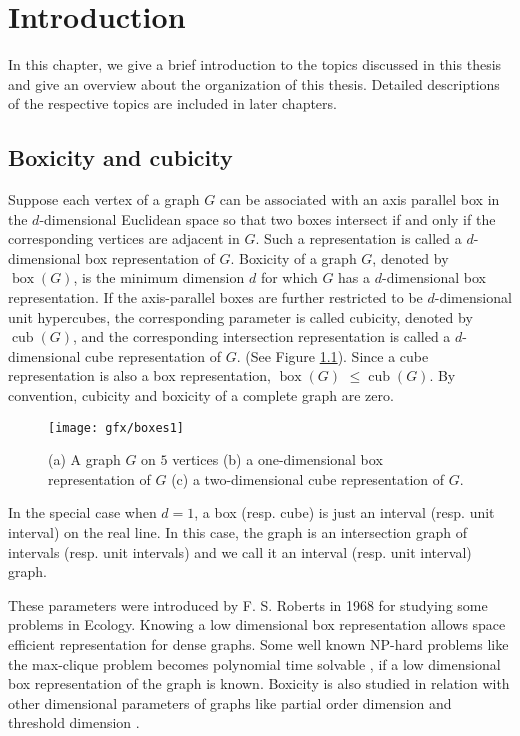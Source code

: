\chapter{Introduction}\label{ch:intro}
In this chapter, we give a brief introduction to the topics discussed in this thesis and give an overview about the organization of this thesis. 
Detailed descriptions of the respective topics are included in later chapters. 
\section{Boxicity and cubicity}\label{introboxicity}
Suppose each vertex of a graph $G$ can be associated with an axis parallel box in the $d$-dimensional Euclidean space so that 
two boxes intersect if and only if the corresponding vertices are adjacent in $G$. 
Such a representation is called  a $d$-dimensional box representation of $G$. 
Boxicity of a graph $G$, denoted by $\operatorname{box}(G)$, is the minimum dimension $d$ for which $G$ has 
a $d$-dimensional box representation.
If the axis-parallel boxes are further restricted to be $d$-dimensional unit hypercubes, the corresponding parameter is called cubicity, 
denoted by $\operatorname{cub}(G)$, and the 
corresponding intersection representation is called a $d$-dimensional cube representation of $G$. (See Figure \ref{FigboxRep}). 
Since a cube representation is also a box representation, $\operatorname{box}(G)$ $\le \operatorname{cub}(G)$. 
By convention, cubicity and boxicity of a complete graph are zero.

\begin{figure}
\begin{center}
\texttt{[image: gfx/boxes1]}
\caption[Box and cube representations]{(a) A graph $G$ on $5$ vertices (b) a one-dimensional box representation of $G$ (c) a two-dimensional cube representation of $G$.}
\label{FigboxRep}
\end{center}
\end{figure}

In the special case when $d=1$, a box (resp. cube) is just an interval (resp. unit interval) on the real line. In this case, 
the graph is an intersection graph of intervals (resp. unit intervals) and we call it an 
interval (resp. unit interval) graph. 

These parameters were introduced by F. S. Roberts \cite{Rob1} in 1968 for studying some problems in Ecology. 
Knowing a low dimensional box representation allows space efficient representation for dense graphs. 
Some well known NP-hard problems like the max-clique 
problem becomes polynomial time solvable \cite{Rosgen}, if a low 
dimensional box representation of the graph is known. 
Boxicity is also studied in relation with other dimensional parameters of graphs like partial order dimension and threshold 
dimension \cite{AdigaCOCOON,Abh1,Yan1}.

